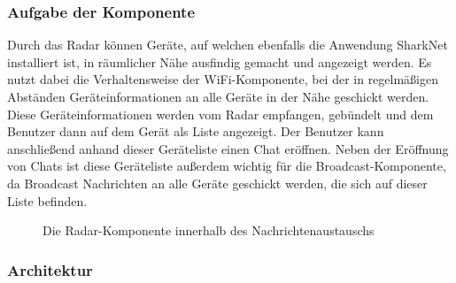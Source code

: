 \subsubsection{Aufgabe der Komponente}
Durch das Radar können Geräte, auf welchen ebenfalls die Anwendung SharkNet installiert ist, in räumlicher Nähe ausfindig gemacht und angezeigt werden. Es nutzt dabei die Verhaltensweise der WiFi-Komponente, bei der in regelmäßigen Abständen Ge\-rä\-te\-in\-for\-ma\-tio\-nen an alle Geräte in der Nähe geschickt werden. Diese Geräteinformationen werden vom Radar empfangen, gebündelt und dem Benutzer dann auf dem Gerät als Liste angezeigt. Der Benutzer kann anschließend anhand dieser Geräteliste einen Chat eröffnen. Neben der Eröffnung von Chats ist diese Geräteliste außerdem wichtig für die Broadcast-Komponente, da Broadcast Nachrichten an alle Geräte geschickt werden, die sich auf dieser Liste befinden.\newline
\begin{figure}[H]
	\centering
	\caption{Die Radar-Komponente innerhalb des Nachrichtenaustauschs}
	\label{fig:radarComp}
\end{figure}
\newpage
\subsubsection{Architektur}

